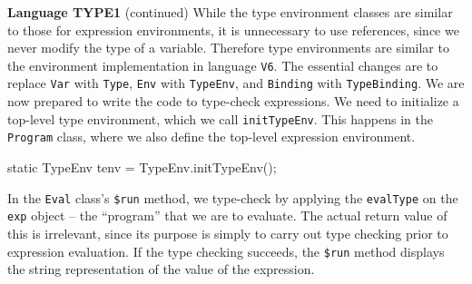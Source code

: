 \begin{minipage}[t]{\sw}
\slidenumber
\LARGE
{\bf Language TYPE1} (continued)\exx
While the type environment classes are similar
to those for expression environments,
it is unnecessary to use references,
since we never modify the type of a variable.
Therefore type environments are similar
to the environment implementation in language \verb'V6'.
The essential changes are to replace \verb'Var' with \verb'Type',
\verb'Env' with \verb'TypeEnv',
and \verb'Binding' with \verb'TypeBinding'.\exx
We are now prepared to write the code to type-check expressions.
We need to initialize a top-level type environment,
which we call \verb'initTypeEnv'.
This happens in the \verb'Program' class,
where we also define the top-level expression environment.
\Large
\begin{qv}
    static TypeEnv tenv = TypeEnv.initTypeEnv();
\end{qv}
\LARGE
In the \verb'Eval' class's \verb'$run' method,
we type-check by applying the \verb'evalType' on the \verb'exp' object
-- the ``program'' that we are to evaluate.
The actual return value of this is irrelevant,
since its purpose is simply to carry out type checking
prior to expression evaluation.
If the type checking succeeds,
the \verb'$run' method displays the string representation
of the value of the expression.
\Large
{}
\end{minipage}
